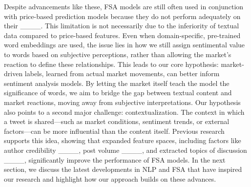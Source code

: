 Despite advancements like these, FSA models are still often used in conjunction with price-based prediction models because they do not perform adequately on their ____. This limitation is not necessarily due to the inferiority of textual data compared to price-based features. Even when domain-specific, pre-trained word embeddings are used, the issue lies in how we still assign sentimental value to words based on subjective perceptions, rather than allowing the market’s reaction to define these relationships. This leads to our core hypothesis: market-driven labels, learned from actual market movements, can better inform sentiment analysis models. By letting the market itself teach the model the significance of words, we aim to bridge the gap between textual content and market reactions, moving away from subjective interpretations. Our hypothesis also points to a second major challenge: contextualization. The context in which a tweet is shared—such as market conditions, sentiment trends, or external factors—can be more influential than the content itself. Previous research supports this idea, showing that expanded feature spaces, including factors like author credibility ____, post volume ____, and extracted topics of discussion ____, significantly improve the performance of FSA models. In the next section, we discuss the latest developments in NLP and FSA that have inspired our research and highlight how our approach builds on these advances.

